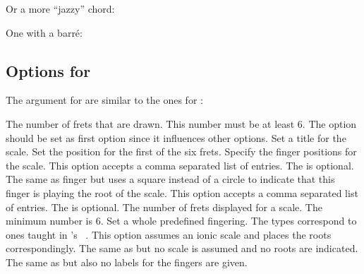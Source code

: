 \documentclass[load-preamble+]{cnltx-doc}
\begin{document}
Or a more "`jazzy"' chord:
\begin{example}
  \chordscheme[
    name      = G\textsuperscript{6} ,
    position  = II ,
    finger    = {1/4:1, 3/3:4, 2/2:3} ,
    root      = 2/6:2 ,
    show-root = 4/4 ,
    mute      = {1,5}
  ]
\end{example}

One with a barr\'e:

\begin{example}
  \chordscheme[
    name      = Gmi\textsuperscript{7} ,
    position  = II ,
    barre     = 2/2-4:3 ,
    show-root = 4/4 ,
    root      = 2/6:2 ,
    mute      = {1,5}
  ]
\end{example}

\subsection{Options for }
The  argument for  are similar to the ones for
:
\begin{options}
    The number of frets that are drawn.  This number must be
    at least 6.  The option should be set as first option since it influences
    other options.
    Set a title for the scale.
    Set the position for the first of the six frets.
    Specify the finger positions for the scale.  This option accepts a comma
    separated list of entries.  The  is optional.
    The same as finger but uses a square instead of a circle to indicate that
    this finger is playing the root of the scale.  This option accepts a comma
    separated list of entries.  The  is optional.
    The number of frets displayed for a scale.  The minimum number is 6.
    Set a whole predefined fingering.  The types correspond to ones taught
    in \citeauthor{leavitt:mmfg:1}'s
    ~\cite{leavitt:mmfg:1}.  This option assumes an
    ionic scale and places the roots correspondingly.
    The same as  but no scale is assumed and no roots are
    indicated.
    The same as  but also no labels for the fingers are given.
\end{options}
\end{document}
